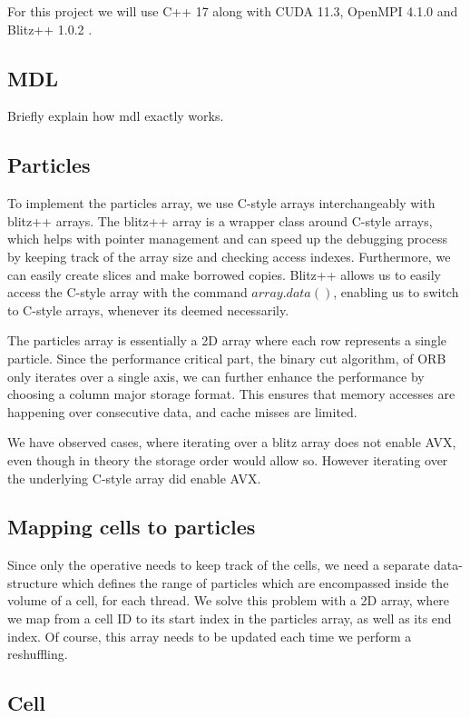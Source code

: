 \documentclass[]{article}
\begin{document}
For this project we will use C++ 17 along with CUDA 11.3, OpenMPI 4.1.0 and Blitz++ 1.0.2 \cite{blitzcpp}. 

\subsection{MDL}

Briefly explain how mdl exactly works. 

\subsection{Particles}

To implement the particles array, we use C-style arrays interchangeably with blitz++ arrays. The blitz++ array is a wrapper class around C-style arrays, which helps with pointer management and can speed up the debugging process by keeping track of the array size and checking access indexes. Furthermore, we can easily create slices and make borrowed copies. 
Blitz++ allows us to easily access the C-style array with the command $array.data()$, enabling us to switch to C-style arrays, whenever its deemed necessarily. 

The particles array is essentially a 2D array where each row represents a single particle. Since the performance critical part, the binary cut algorithm, of ORB only iterates over a single axis, we can further enhance the performance by choosing a column major storage format. This ensures that memory accesses are happening over consecutive data, and cache misses are limited.

We have observed cases, where iterating over a blitz array does not enable AVX, even though in theory the storage order would allow so. However iterating over the underlying C-style array did enable AVX.

\subsection{Mapping cells to particles}

Since only the operative needs to keep track of the cells, we need a separate data-structure which defines the range of particles which are encompassed inside the volume of a cell, for each thread. We solve this problem with a 2D array, where we map from a cell ID to its start index in the particles array, as well as its end index. Of course, this array needs to be updated each time we perform a reshuffling.

\subsection{Cell}
\end{document}
